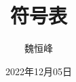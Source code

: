 \documentclass[]{beamer}
\title[语义分析]{符号表}
\author[魏恒峰]{\large 魏恒峰}
\institute{hfwei@nju.edu.cn}
\date{2022年12月05日}
\begin{document}
\maketitle



\thankyou{}

\end{document}
